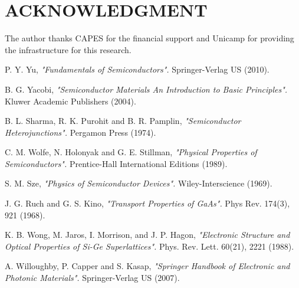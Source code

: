 \documentclass[%
reprint,
amsmath,amssymb,
aps,
]{revtex4-1}
\begin{document}
\section*{ACKNOWLEDGMENT}
		
The author thanks CAPES for the financial support and Unicamp for providing the infrastructure for this research.

\begin{thebibliography}{10}
		\thispagestyle{empty} %
	P. Y. Yu,
	\newblock \textit{"Fundamentals of Semiconductors".}
	\newblock Springer-Verlag US (2010). 

B. G. Yacobi,
\newblock \textit{"Semiconductor Materials An Introduction to Basic Principles".}
\newblock Kluwer Academic Publishers (2004). 


B. L. Sharma, R. K. Purohit and B. R. Pamplin, 
\newblock \textit{"Semiconductor Heterojunctions".}
\newblock Pergamon Press (1974).

C. M. Wolfe, N. Holonyak and G. E. Stillman,
\newblock \textit{ "Physical Properties of Semiconductors".}
\newblock Prentice-Hall International Editions (1989).


S. M. Sze,
\newblock \textit{"Physics of Semiconductor Devices".}
\newblock Wiley-Interscience (1969).


J. G. Ruch and G. S. Kino,
\newblock \textit{ "Transport Properties of GaAs".}
\newblock Phys Rev. 174(3), 921 (1968).

K. B. Wong, M. Jaros, I. Morrison, and J. P. Hagon,
\newblock \textit{ "Electronic Structure and Optical Properties of Si-Ge Superlattices".}
\newblock Phys. Rev. Lett. 60(21), 2221 (1988).



A. Willoughby, P. Capper and S. Kasap,
\newblock \textit{"Springer Handbook of Electronic and Photonic Materials".}
\newblock Springer-Verlag US (2007). 






	
\end{thebibliography}
	

	
	
	
	
	
	
	
	
	
	
	
	
	
\end{document}
